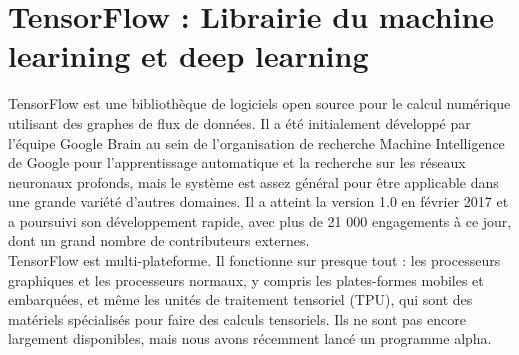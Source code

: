 \section{TensorFlow : Librairie du machine learining et deep learning}
TensorFlow est une bibliothèque de logiciels open source pour le calcul numérique utilisant des graphes de flux de données. Il a été initialement développé par l'équipe Google Brain au sein de l'organisation de recherche Machine Intelligence de Google pour l'apprentissage automatique et la recherche sur les réseaux neuronaux profonds, mais le système est assez général pour être applicable dans une grande variété d'autres domaines. Il a atteint la version 1.0 en février 2017 et a poursuivi son développement rapide, avec plus de 21 000 engagements à ce jour, dont un grand nombre de contributeurs externes.\\[0.5cm]
TensorFlow est multi-plateforme. Il fonctionne sur presque tout : les processeurs graphiques et les processeurs normaux, y compris les plates-formes mobiles et embarquées, et même les unités de traitement tensoriel (TPU), qui sont des matériels spécialisés pour faire des calculs tensoriels. Ils ne sont pas encore largement disponibles, mais nous avons récemment lancé un programme alpha.

